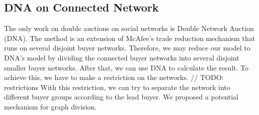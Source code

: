 \documentclass[format=acmsmall, review=false, natbib=false]{acmart}
\begin{document}
\subsection{DNA on Connected Network}
The only work on double auctions on social networks is Double Network Auction (DNA)\cite{DNA}. The method is an extension of McAfee's trade reduction mechanism that runs on several disjoint buyer networks. Therefore, we may reduce our model to DNA's model
by dividing the connected buyer networks into several disjoint smaller buyer networks. After that, we can use DNA to calculate the result. To achieve this, we have to make a restriction on the networks.
// TODO: restrictions
With this restriction, we can try to separate the network into different buyer groups according to the lead buyer. We proposed a potential mechanism for graph division.
\end{document}
